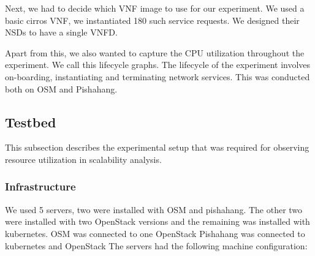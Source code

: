 Next, we had to decide which VNF image to use for our experiment. We used a basic cirros VNF, we instantiated 180 such service requests. We designed their NSDs to have a single VNFD. 

Apart from this, we also wanted to capture the CPU utilization throughout the experiment. We call this lifecycle graphs. The lifecycle of the experiment involves on-boarding, instantiating and terminating network services. This was conducted both on OSM and Pishahang.  


\subsection{Testbed}

This subsection describes the experimental setup that was required for observing resource utilization in scalability analysis.
\subsubsection{Infrastructure}

We used 5 servers, two were installed with OSM and pishahang. The other two were installed with two OpenStack versions and the remaining was installed with kubernetes. OSM was connected to one OpenStack Pishahang was connected to kubernetes and OpenStack The servers had the following machine configuration:


